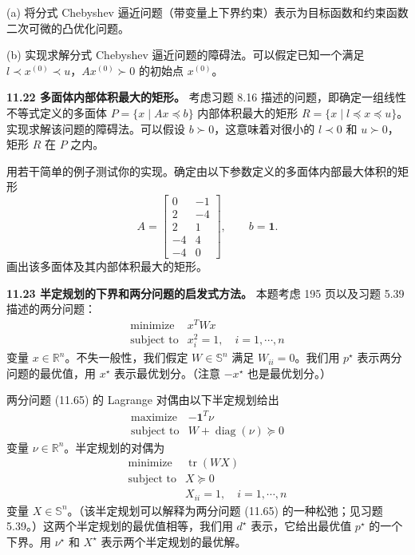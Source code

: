 \documentclass[UTF8,12pt,a4paper,fontset=fandol]{ctexart}
\begin{document}
(a) 将分式 Chebyshev 逼近问题（带变量上下界约束）表示为目标函数和约束函数二次可微的凸优化问题。

(b) 实现求解分式 Chebyshev 逼近问题的障碍法。可以假定已知一个满足 $l\prec x^{(0)}\prec u$，$Ax^{(0)}\succ 0$ 的初始点 $x^{(0)}$。

\noindent\textbf{11.22 多面体内部体积最大的矩形。} 考虑习题 8.16 描述的问题，即确定一组线性不等式定义的多面体 $P=\{x\mid Ax\preceq b\}$ 内部体积最大的矩形 $R=\{x\mid l\preceq x\preceq u\}$。实现求解该问题的障碍法。可以假设 $b\succ 0$，这意味着对很小的 $l\prec 0$ 和 $u\succ 0$，矩形 $R$ 在 $P$ 之内。

用若干简单的例子测试你的实现。确定由以下参数定义的多面体内部最大体积的矩形
\[
A=\begin{bmatrix}
0 & -1\\
2 & -4\\
2 & 1\\
-4 & 4\\
-4 & 0
\end{bmatrix},\qquad b=\mathbf{1}.
\]
画出该多面体及其内部体积最大的矩形。

\noindent\textbf{11.23 半定规划的下界和两分问题的启发式方法。} 本题考虑 195 页以及习题 5.39 描述的两分问题：
\begin{equation}
\begin{array}{ll}
\text{minimize} & x^TWx\\
\text{subject to} & x_i^2=1,\quad i=1,\cdots,n
\end{array}
\tag{11.65}
\end{equation}
变量 $x\in\mathbb{R}^n$。不失一般性，我们假定 $W\in\mathbb{S}^n$ 满足 $W_{ii}=0$。我们用 $p^\star$ 表示两分问题的最优值，用 $x^\star$ 表示最优划分。（注意 $-x^\star$ 也是最优划分。）

两分问题 (11.65) 的 Lagrange 对偶由以下半定规划给出
\begin{equation}
\begin{array}{ll}
\text{maximize} & -\mathbf{1}^T\nu\\
\text{subject to} & W+\operatorname{diag}(\nu)\succeq 0
\end{array}
\tag{11.66}
\end{equation}
变量 $\nu\in\mathbb{R}^n$。半定规划的对偶为
\begin{equation}
\begin{array}{ll}
\text{minimize} & \operatorname{tr}(WX)\\
\text{subject to} & X\succeq 0\\
& X_{ii}=1,\quad i=1,\cdots,n
\end{array}
\tag{11.67}
\end{equation}
变量 $X\in\mathbb{S}^n$。（该半定规划可以解释为两分问题 (11.65) 的一种松弛；见习题 5.39。）这两个半定规划的最优值相等，我们用 $d^\star$ 表示，它给出最优值 $p^\star$ 的一个下界。用 $\nu^\star$ 和 $X^\star$ 表示两个半定规划的最优解。
\end{document}
